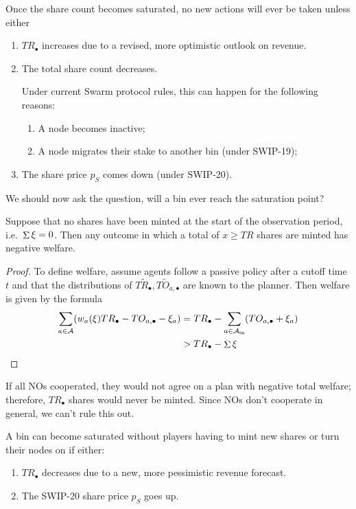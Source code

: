 Once the share count becomes saturated, no new actions will ever be taken unless either
\begin{enumerate}
  \item $TR_\bullet$ increases due to a revised, more optimistic outlook on revenue.
  \item The total share count decreases. 
  
    Under current Swarm protocol rules, this can happen for the following reasons:
  \begin{enumerate}
    \item A node becomes inactive;
    \item A node migrates their stake to another bin (under SWIP-19);
  \end{enumerate}
  \item The share price $p_S$ comes down (under SWIP-20).
\end{enumerate}

We should now ask the question, will a bin ever reach the saturation point?

\begin{proposition}

  Suppose that no shares have been minted at the start of the observation period, i.e.~$\mathop{\Sigma}\xi=0$.
  Then any outcome in which a total of $x\geq TR$ shares are minted has negative welfare.

\end{proposition}
%
\begin{proof}

  To define welfare, assume agents follow a passive policy after a cutoff time $t$ and that the distributions of $T\tilde{R}_\bullet,T\tilde{O}_{a,\bullet}$ are known to the planner.
  Then welfare is given by the formula
  \begin{align*}
    \sum_{a\in\mathcal{A}}(w_a(\xi)TR_\bullet-TO_{a,\bullet} - \xi_a) &= TR_\bullet - \sum_{a\in\mathcal{A}_{\mathtt{on}}}(TO_{a,\bullet} + \xi_a) \\
    &> TR_\bullet - \mathop{\Sigma} \xi \qedhere
  \end{align*}

\end{proof}

If all NOs cooperated, they would not agree on a plan with negative total welfare; therefore, $TR_\bullet$ shares would never be minted.
%
Since NOs don't cooperate in general, we can't rule this out.

A bin can become saturated without players having to mint new shares or turn their nodes on if either:
\begin{enumerate}
  \item $TR_\bullet$ decreases due to a new, more pessimistic revenue forecast.
  \item The SWIP-20 share price $p_S$ goes up.
\end{enumerate}



